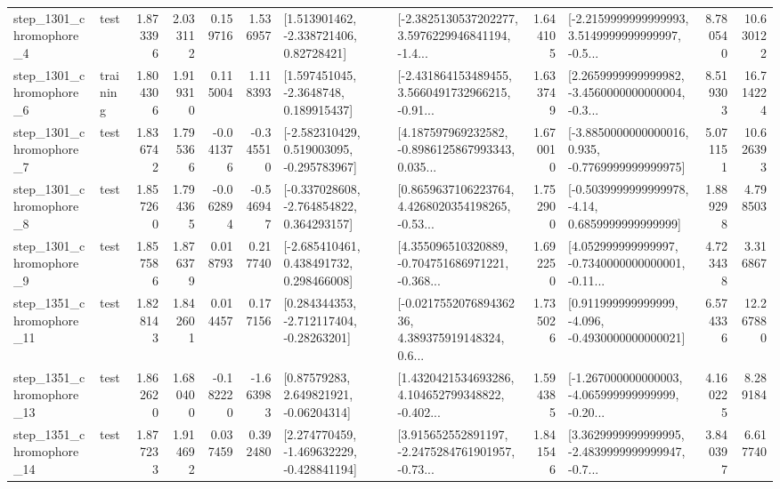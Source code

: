 \begin{tabular}{llrrrrllrlrr}
  step\_1301\_chromophore\_4 &      test &      1.873396 &    2.033112 &      0.159716 &  1.536957 &     [1.513901462, -2.338721406, 0.82728421] &  [-2.3825130537202277, 3.5976229946841194, -1.4... &       1.644105 &  [-2.2159999999999993, 3.5149999999999997, -0.5... &            8.780540 &         10.630122 \\
  step\_1301\_chromophore\_6 &  training &      1.804306 &    1.919310 &      0.115004 &  1.118393 &      [1.597451045, -2.3648748, 0.189915437] &  [-2.431864153489455, 3.5660491732966215, -0.91... &       1.633749 &  [2.2659999999999982, -3.4560000000000004, -0.3... &            8.519303 &         16.714224 \\
  step\_1301\_chromophore\_7 &      test &      1.836742 &    1.795366 &     -0.041376 & -0.345510 &   [-2.582310429, 0.519003095, -0.295783967] &  [4.187597969232582, -0.8986125867993343, 0.035... &       1.670010 &  [-3.8850000000000016, 0.935, -0.7769999999999975] &            5.071151 &         10.626393 \\
  step\_1301\_chromophore\_8 &      test &      1.857260 &    1.794365 &     -0.062894 & -0.546947 &   [-0.337028608, -2.764854822, 0.364293157] &  [0.8659637106223764, 4.4268020354198265, -0.53... &       1.752900 &   [-0.5039999999999978, -4.14, 0.6859999999999999] &            1.889298 &          4.798503 \\
  step\_1301\_chromophore\_9 &      test &      1.857586 &    1.876379 &      0.018793 &  0.217740 &    [-2.685410461, 0.438491732, 0.298466008] &  [4.355096510320889, -0.704751686971221, -0.368... &       1.692250 &  [4.052999999999997, -0.7340000000000001, -0.11... &            4.723438 &          3.316867 \\
 step\_1351\_chromophore\_11 &      test &      1.828143 &    1.842601 &      0.014457 &  0.177156 &    [0.284344353, -2.712117404, -0.28263201] &  [-0.021755207689436236, 4.389375919148324, 0.6... &       1.735026 &   [0.911999999999999, -4.096, -0.4930000000000021] &            6.574336 &         12.267880 \\
 step\_1351\_chromophore\_13 &      test &      1.862620 &    1.680400 &     -0.182220 & -1.663983 &      [0.87579283, 2.649821921, -0.06204314] &  [1.4320421534693286, 4.104652799348822, -0.402... &       1.594385 &  [-1.267000000000003, -4.065999999999999, -0.20... &            4.160225 &          8.289184 \\
 step\_1351\_chromophore\_14 &      test &      1.877233 &    1.914692 &      0.037459 &  0.392480 &   [2.274770459, -1.469632229, -0.428841194] &  [3.915652552891197, -2.2475284761901957, -0.73... &       1.841546 &  [3.3629999999999995, -2.4839999999999947, -0.7... &            3.840397 &          6.617740 \\

\end{tabular}
